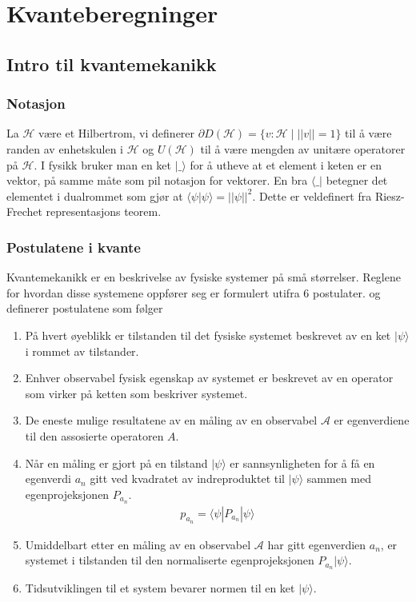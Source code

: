 \section{Kvanteberegninger}

\subsection{Intro til kvantemekanikk}

    \subsubsection*{Notasjon}

        La $\mathcal{H}$ være et Hilbertrom, vi definerer $\partial D(\mathcal{H})=\{v:\mathcal{H}\mid ||v||=1\}$ til å være randen av enhetskulen i $\mathcal{H}$ og $U(\mathcal{H})$ til å være mengden av unitære operatorer på $\mathcal{H}$. I fysikk bruker man en ket $|\_\rangle$ for å utheve at et element i keten er en vektor, på samme måte som pil notasjon for vektorer. En bra $\langle\_ |$ betegner det elementet i dualrommet som gjør at $\langle\psi |\psi\rangle = ||\psi||^2$. Dette er veldefinert fra Riesz-Frechet representasjons teorem.

    \subsubsection*{Postulatene i kvante}

        Kvantemekanikk er en beskrivelse av fysiske systemer på små størrelser. Reglene for hvordan disse systemene oppfører seg er formulert utifra 6 postulater. \cite{Jaffe_2007} og \cite{portugal_2019} definerer postulatene som følger
        \begin{enumerate}
            \item På hvert øyeblikk er tilstanden til det fysiske systemet beskrevet av en ket $|\psi\rangle$ i rommet av tilstander.
            \item Enhver observabel fysisk egenskap av systemet er beskrevet av en operator som virker på ketten som beskriver systemet.
            \item De eneste mulige resultatene av en måling av en observabel $\mathcal{A}$ er egenverdiene til den assosierte operatoren $A$.
            \item Når en måling er gjort på en tilstand $|\psi\rangle$ er sannsynligheten for å få en egenverdi $a_n$ gitt ved kvadratet av indreproduktet til $|\psi\rangle$ sammen med egenprojeksjonen $P_{a_n}$.
            \begin{align*}
                p_{a_n} = \langle \psi|P_{a_n}|\psi\rangle
            \end{align*}
            \item Umiddelbart etter en måling av en observabel $\mathcal{A}$ har gitt egenverdien $a_n$, er systemet i tilstanden til den normaliserte egenprojeksjonen $P_{a_n}|\psi\rangle$.
            \item Tidsutviklingen til et system bevarer normen til en ket $|\psi\rangle$.
        \end{enumerate}

